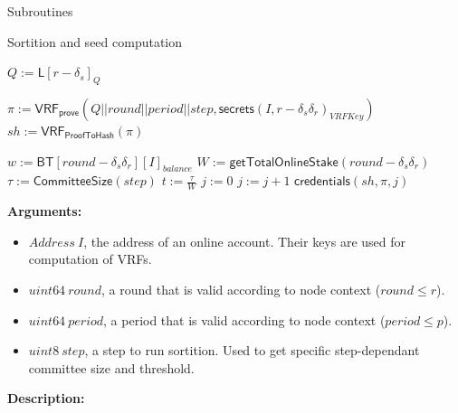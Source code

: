 \documentclass[10pt,a4paper]{article}
\begin{document}
\begin{section}{Subroutines}
\begin{subsection}{Sortition and seed computation}
\begin{algorithm}[H]
    \label{algo:sortition}
    \begin{algorithmic}[1]
        \State $Q := \mathsf{L}[r - \delta_s]_{Q}$

        \State $\pi := \mathsf{VRF_{prove}}(Q||round||period||step, \mathsf{secrets}(I, r-\delta_s\delta_r)_{VRFKey})$
        \State $sh := \mathsf{VRF_{ProofToHash}}(\pi)$

        \State $w := \mathsf{BT}[round-\delta_s\delta_r][I]_{balance}$
        \State $W := \mathsf{getTotalOnlineStake}(round-\delta_s\delta_r)$
        \State $\tau := \mathsf{CommitteeSize}(step)$
        \State $t := \frac{\tau}{W}$
        \State $j := 0$
        \While{$\frac{sh}{2^{\mathsf{log_2}(sh)}}\notin [ \sum_{k=0}^j\mathsf{B}(k;w,t), \sum_{k=0}^{j+1}\mathsf{B}(k;w,t))$}
            \State $j := j+1$
        \EndWhile
        \State \Return $\mathsf{credentials}(sh, \pi, j)$
    \EndFunction
    \end{algorithmic}
    \caption{\underline{Sortition}}
\end{algorithm}


\noindent \textbf{Arguments:}
\begin{itemize}
    \item $Address \ I$, the address of an online account. Their keys are used for computation of VRFs.
    \item $uint64 \ round$, a round that is valid according to node context ($round \leq r$).
    \item $uint64 \ period$, a period that is valid according to node context ($period \leq p$).
    \item $uint8 \ step$, a step to run sortition. Used to get specific step-dependant committee size and threshold.
\end{itemize}

\noindent \textbf{Description:}


\end{subsection}
\end{section}
\end{document}
